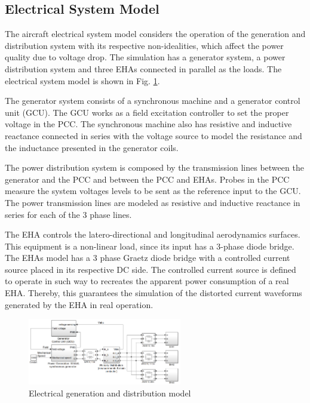 \subsection{Electrical System Model}

The aircraft electrical system model considers the operation of the generation and distribution system with its respective non-idealities, which affect the power quality due to voltage drop. The simulation has a generator system, a power distribution system and three EHAs connected in parallel as the loads. The electrical system model is shown in Fig. \ref{fig:simulacao_simulink.png}.

The generator system consists of a synchronous machine and a generator control unit (GCU). The GCU works as a field excitation controller to set the proper voltage in the PCC. The synchronous machine also has resistive and inductive reactance connected in series with the voltage source to model the resistance and the inductance presented in the generator coils.

The power distribution system is composed by the transmission lines between the generator and the PCC and between the PCC and EHAs. Probes in the PCC measure the system voltages levels to be sent as the reference input to the GCU. The power transmission lines are modeled as resistive and inductive reactance in series for each of the 3 phase lines.

The EHA controls the latero-directional and longitudinal aerodynamics surfaces. This equipment is a non-linear load, since its input has a 3-phase diode bridge. The EHAs model has a 3 phase Graetz diode bridge with a controlled current source placed in its respective DC side. The controlled current source is defined to operate in such way to recreates the apparent power consumption of a real EHA. Thereby, this guarantees the simulation of the distorted current waveforms generated by the EHA in real operation.

\begin{figure}[!tb] %
	\centering
	\includegraphics[width=0.6\textwidth]{Figures/simulacao_simulink.png}
	\caption{Electrical generation and distribution model}
	\label{fig:simulacao_simulink.png}
\end{figure}

